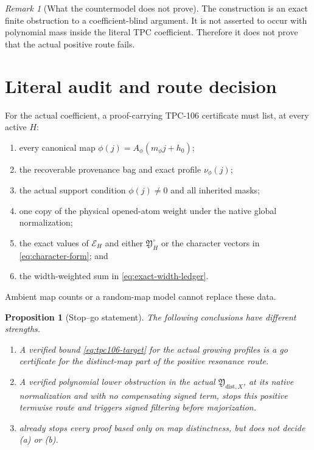 \documentclass[11pt]{article}
\newtheorem{proposition}[theorem]{Proposition}
\theoremstyle{remark}
\newtheorem{remark}[theorem]{Remark}
\newcommand{\Xdist}{\mathfrak Y_{\mathrm{dist},X}}
\newcommand{\YH}{\mathfrak Y_H^\circ}
\begin{document}
\begin{remark}[What the countermodel does not prove]
The construction is an exact finite obstruction to a
coefficient-blind argument.  It is not asserted to occur with
polynomial mass inside the literal TPC coefficient.  Therefore it
does not prove that the actual positive route fails.
\end{remark}

\section{Literal audit and route decision}

For the actual coefficient, a proof-carrying TPC-106 certificate
must list, at every active \(H\):
\begin{enumerate}[label=(\roman*),leftmargin=2.2em]
\item every canonical map
\(\phi(j)=A_\phi(m_\phi j+h_0)\);
\item the recoverable provenance bag and exact profile
\(\nu_\phi(j)\);
\item the actual support condition \(\phi(j)\ne0\) and all inherited
masks;
\item one copy of the physical opened-atom weight under the native
global normalization;
\item the exact values of \(\mathcal E_H\) and either
\(\YH\) or the character vectors in
\eqref{eq:character-form}; and
\item the width-weighted sum in \eqref{eq:exact-width-ledger}.
\end{enumerate}
Ambient map counts or a random-map model cannot replace these data.

\begin{proposition}[Stop--go statement]
\label{prop:stop-go}
The following conclusions have different strengths.
\begin{enumerate}[label=(\alph*),leftmargin=2.2em]
\item A verified bound \eqref{eq:tpc106-target} for the actual
growing profiles is a go certificate for the distinct-map part of
the positive resonance route.
\item A verified polynomial lower obstruction in the actual
\(\Xdist\), at its native normalization and with no compensating
signed term, stops this positive termwise route and triggers signed
filtering before majorization.
\item {} already stops every proof based
only on map distinctness, but does not decide (a) or (b).
\end{enumerate}
\end{proposition}
\end{document}
